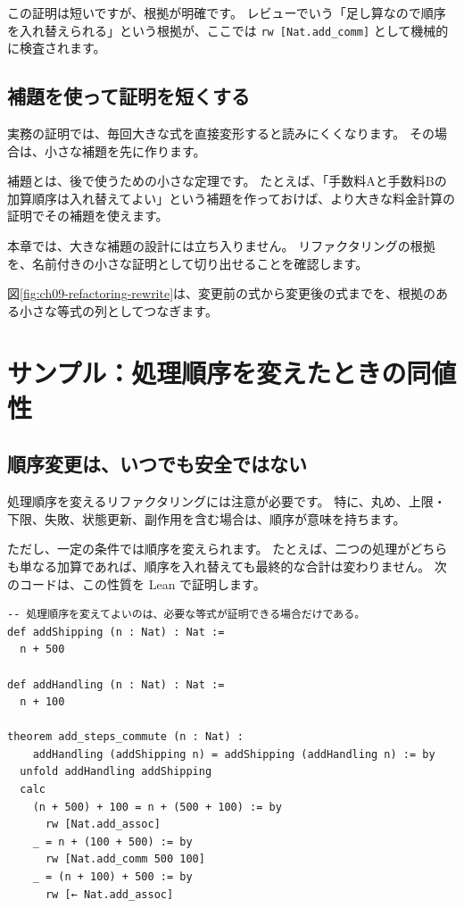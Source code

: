 この証明は短いですが、根拠が明確です。
レビューでいう「足し算なので順序を入れ替えられる」という根拠が、ここでは \texttt{rw [Nat.add\_comm]} として機械的に検査されます。

\subsection{補題を使って証明を短くする}

実務の証明では、毎回大きな式を直接変形すると読みにくくなります。
その場合は、小さな補題を先に作ります。

補題とは、後で使うための小さな定理です。
たとえば、「手数料Aと手数料Bの加算順序は入れ替えてよい」という補題を作っておけば、より大きな料金計算の証明でその補題を使えます。

本章では、大きな補題の設計には立ち入りません。
リファクタリングの根拠を、名前付きの小さな証明として切り出せることを確認します。

図\ref{fig:ch09-refactoring-rewrite}は、変更前の式から変更後の式までを、根拠のある小さな等式の列としてつなぎます。


\section{サンプル：処理順序を変えたときの同値性}

\subsection{順序変更は、いつでも安全ではない}

処理順序を変えるリファクタリングには注意が必要です。
特に、丸め、上限・下限、失敗、状態更新、副作用を含む場合は、順序が意味を持ちます。

ただし、一定の条件では順序を変えられます。
たとえば、二つの処理がどちらも単なる加算であれば、順序を入れ替えても最終的な合計は変わりません。
次のコードは、この性質を Lean で証明します。

\begin{listing}[htbp]
\begin{verbatim}
-- 処理順序を変えてよいのは、必要な等式が証明できる場合だけである。
def addShipping (n : Nat) : Nat :=
  n + 500

def addHandling (n : Nat) : Nat :=
  n + 100

theorem add_steps_commute (n : Nat) :
    addHandling (addShipping n) = addShipping (addHandling n) := by
  unfold addHandling addShipping
  calc
    (n + 500) + 100 = n + (500 + 100) := by
      rw [Nat.add_assoc]
    _ = n + (100 + 500) := by
      rw [Nat.add_comm 500 100]
    _ = (n + 100) + 500 := by
      rw [← Nat.add_assoc]
\end{verbatim}
\caption{\texttt{add\_steps\_commute}}
\label{lst:ch09_order_commutes}
\end{listing}

